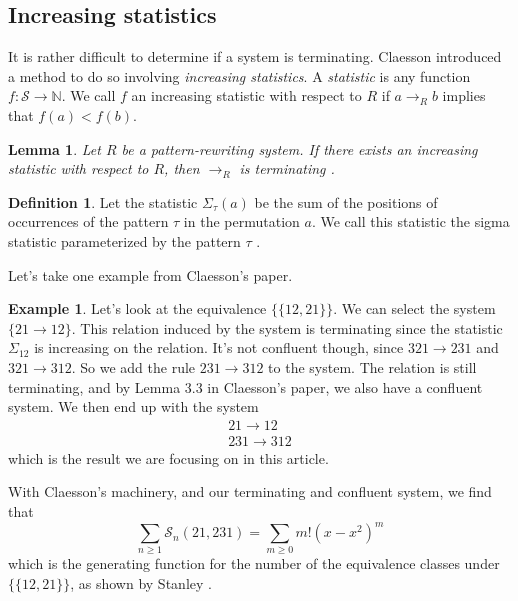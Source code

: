 \documentclass[a4paper, 11pt, english]{article}
\newcommand{\patternrule}{ \to \!}
\newtheorem{lemma}[theorem]{Lemma}
\theoremstyle{definition}
\newtheorem{definition}[theorem]{Definition}
\newtheorem{example}[theorem]{Example}
\newcommand{\Sym}{\mathcal{S}}
\begin{document}
\subsection{Increasing statistics}
It is rather difficult to determine if a system is terminating. Claesson introduced a method to
do so involving \emph{increasing statistics}.
A \emph{statistic} is any function $f : \Sym \to \mathbb{N}$. We call $f$ an increasing
statistic with respect to $R$ if $a \to_R b$ implies that $f(a) < f(b)$.

\begin{lemma}
    Let $R$ be a pattern-rewriting system. If there exists an increasing
    statistic with respect to $R$, then $\to_R$ is terminating
    \cite{claesson:2021}.
\end{lemma}

\begin{definition}
    Let the statistic $\Sigma_\tau(a)$ be the sum of the positions of occurrences of
    the pattern $\tau$ in the permutation $a$. We call this statistic the sigma statistic
    parameterized by the pattern $\tau$
    \cite{claesson:2021}.
\end{definition}

Let's take one example from Claesson's paper.
\begin{example}
    Let's look at the equivalence $\{ \{ 12, 21 \} \}$. We can select the system $\{
        21 \to 12 \}$. This relation induced by the system is terminating since the statistic
    $\Sigma_{12}$ is increasing on the relation. It's not
    confluent though, since $321 \to 231$ and $321 \to 312$. So we add the rule
    $231 \patternrule 312$ to the system. The relation is still terminating, and by Lemma
    3.3 in Claesson's paper, we also have a confluent system. We then end up with
    the system 
    \[
      \begin{matrix}
        21 \patternrule 12 \\
        231 \patternrule 312
      \end{matrix}
    \]
    which is the result we are focusing on in this article.

    With Claesson's machinery, and our terminating and confluent system, we find that 
    \[
        \sum_{n \geq 1} \Sym_n(21, 231) = \sum_{m \geq 0} m!(x-x^2)^m
    \]
    which is the generating function for the number of the equivalence classes under
    $\{ \{ 12, 21 \} \}$, as shown by Stanley \cite{stanley:2012}.
\end{example}
\end{document}
